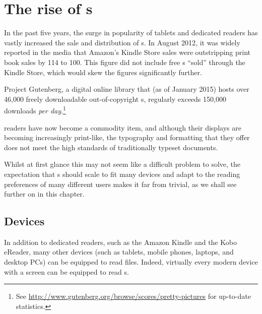 \chapter{The rise of \ebook{}s} \label{ch:intro}


In the past five years, the surge in popularity of tablets and dedicated \ebook{} readers has vastly increased the sale and distribution of \ebook{}s. In August 2012, it was widely reported in the media\hspace{0pt}\cite{hexus.net2012} that Amazon's Kindle Store sales were outstripping print book sales by 114 to 100. This figure did not include free \ebook{}s ``sold'' through the Kindle Store, which would skew the figures significantly further.

Project Gutenberg, a digital online library that (as of January 2015) hosts over 46,000 freely downloadable out-of-copyright \ebook{}s, regularly exceeds 150,000 downloads \emph{per day}.\footnote{See \url{http://www.gutenberg.org/browse/scores/pretty-pictures} for up-to-date statistics.}

\Ebook{} readers have now become a commodity item, and although their displays are becoming increasingly print-like, the typography and formatting that they offer does not meet the high standards of traditionally typeset documents.

Whilst at first glance this may not seem like a difficult problem to solve, the expectation that \ebook{}s should scale to fit many devices and adapt to the reading preferences of many different users makes it far from trivial, as we shall see further on in this chapter.

\section{Devices}

In addition to dedicated \ebook{} readers, such as the Amazon Kindle and the Kobo eReader, many other devices (such as tablets, mobile phones, laptops, and desktop PCs) can be equipped to read \ebook{} files. Indeed, virtually every modern device with a screen can be equipped to read \ebook{}s.

